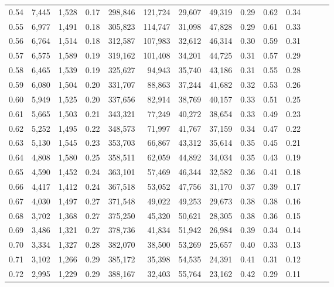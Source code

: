 \begin{tabular}{rrrrrrrrrrrrrr}
0.54 &  7,445 &  1,528 &  0.17 &  298,846 &  121,724 &  29,607 &  49,319 &  0.29 &  0.62 &      0.34 \\
0.55 &  6,977 &  1,491 &  0.18 &  305,823 &  114,747 &  31,098 &  47,828 &  0.29 &  0.61 &      0.33 \\
0.56 &  6,764 &  1,514 &  0.18 &  312,587 &  107,983 &  32,612 &  46,314 &  0.30 &  0.59 &      0.31 \\
0.57 &  6,575 &  1,589 &  0.19 &  319,162 &  101,408 &  34,201 &  44,725 &  0.31 &  0.57 &      0.29 \\
0.58 &  6,465 &  1,539 &  0.19 &  325,627 &   94,943 &  35,740 &  43,186 &  0.31 &  0.55 &      0.28 \\
0.59 &  6,080 &  1,504 &  0.20 &  331,707 &   88,863 &  37,244 &  41,682 &  0.32 &  0.53 &      0.26 \\
0.60 &  5,949 &  1,525 &  0.20 &  337,656 &   82,914 &  38,769 &  40,157 &  0.33 &  0.51 &      0.25 \\
0.61 &  5,665 &  1,503 &  0.21 &  343,321 &   77,249 &  40,272 &  38,654 &  0.33 &  0.49 &      0.23 \\
0.62 &  5,252 &  1,495 &  0.22 &  348,573 &   71,997 &  41,767 &  37,159 &  0.34 &  0.47 &      0.22 \\
0.63 &  5,130 &  1,545 &  0.23 &  353,703 &   66,867 &  43,312 &  35,614 &  0.35 &  0.45 &      0.21 \\
0.64 &  4,808 &  1,580 &  0.25 &  358,511 &   62,059 &  44,892 &  34,034 &  0.35 &  0.43 &      0.19 \\
0.65 &  4,590 &  1,452 &  0.24 &  363,101 &   57,469 &  46,344 &  32,582 &  0.36 &  0.41 &      0.18 \\
0.66 &  4,417 &  1,412 &  0.24 &  367,518 &   53,052 &  47,756 &  31,170 &  0.37 &  0.39 &      0.17 \\
0.67 &  4,030 &  1,497 &  0.27 &  371,548 &   49,022 &  49,253 &  29,673 &  0.38 &  0.38 &      0.16 \\
0.68 &  3,702 &  1,368 &  0.27 &  375,250 &   45,320 &  50,621 &  28,305 &  0.38 &  0.36 &      0.15 \\
0.69 &  3,486 &  1,321 &  0.27 &  378,736 &   41,834 &  51,942 &  26,984 &  0.39 &  0.34 &      0.14 \\
0.70 &  3,334 &  1,327 &  0.28 &  382,070 &   38,500 &  53,269 &  25,657 &  0.40 &  0.33 &      0.13 \\
0.71 &  3,102 &  1,266 &  0.29 &  385,172 &   35,398 &  54,535 &  24,391 &  0.41 &  0.31 &      0.12 \\
0.72 &  2,995 &  1,229 &  0.29 &  388,167 &   32,403 &  55,764 &  23,162 &  0.42 &  0.29 &      0.11 \\

\end{tabular}
